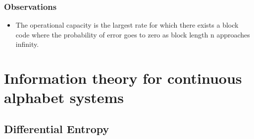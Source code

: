 \documentclass{article}
\begin{document}
\subsubsection{Observations}
\begin{itemize}
    \item The operational capacity is the largest rate for which there exists a block code where the probability of error goes to zero as block length n approaches infinity.
\end{itemize}

\section{Information theory for continuous alphabet systems}
\subsection{Differential Entropy}
\end{document}
